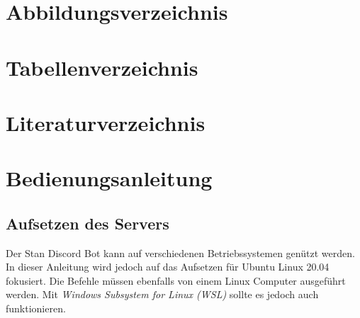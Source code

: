 \documentclass[a4paper, table]{article}
\begin{document}
\section{Abbildungsverzeichnis}
\listoffigures

\section{Tabellenverzeichnis}
\listoftables

\section{Literaturverzeichnis}
\printbibliography

\newpage
\section{Bedienungsanleitung}\label{Bedienungsanleitung}

\subsection{Aufsetzen des Servers}

Der Stan Discord Bot kann auf verschiedenen Betriebssystemen genützt werden.
In dieser Anleitung wird jedoch auf das Aufsetzen für Ubuntu Linux 20.04 fokusiert.
Die Befehle müssen ebenfalls von einem Linux Computer ausgeführt werden.
Mit \textit{Windows Subsystem for Linux (WSL)} sollte es jedoch auch funktionieren.
\end{document}
